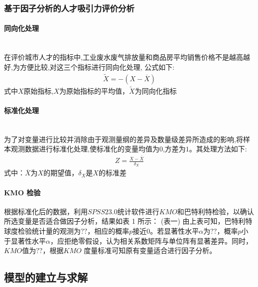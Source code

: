 \documentclass{whutmod}
\begin{document}
		\subsubsection{基于因子分析的人才吸引力评价分析}
		\paragraph{同向化处理}
		~\\ 
		在评价城市人才的指标中,工业废水废气排放量和商品房平均销售价格不是越高越好,为方便比较,对这三个指标进行同向化处理, 公式如下:
		\begin{gather}
		\widetilde{X}=-(X-\overline{X})
		\end{gather}
		式中$X$原始指标,$X$为原始指标的平均值，$\widetilde{X}$为同向化指标
		\paragraph{标准化处理}
		~\\
		为了对变量进行比较并消除由于观测量纲的差异及数量级差异所造成的影响,将样本观测数据进行标准化处理,使标准化的变量均值为$0$,方差为$1$。其处理方法如下:
		\begin{gather}
		Z=\frac{X-\overline{X}}{\delta_{X}}
		\end{gather}
		式中：$\overline{X}$为$X$的期望值，$\delta_{X}$是$X$的标准差
		\paragraph{ KMO 检验}
		根据标准化后的数据，利用$SPSS23.0$统计软件进行$KMO$和巴特利特检验，以确认所选变量是否适合做因子分析，结果如表 1 所示：
		(表一)
		由上表可知，巴特利特球度检验统计量的观测为$??$，相应的概率$p$接近$0$。若显著性水平$α$为$??$，概率$p$小于显著性水平$α$，应拒绝零假设，认为相关系数矩阵与单位阵有显著差异。同时，$KMO$值为$??$，根据$KMO$ 度量标准可知原有变量适合进行因子分析。

	\subsection{模型的建立与求解}
\end{document}
